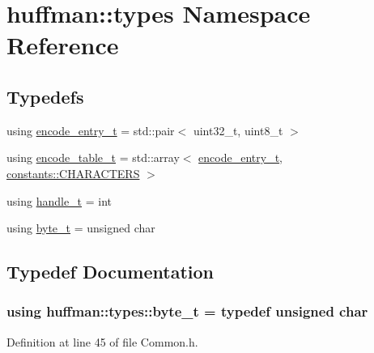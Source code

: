\hypertarget{namespacehuffman_1_1types}{}\section{huffman\+:\+:types Namespace Reference}
\label{namespacehuffman_1_1types}
\subsection*{Typedefs}
\begin{DoxyCompactItemize}
\item 
using \hyperlink{namespacehuffman_1_1types_a562530b9038f6a3cb2923f1c116a450c}{encode\+\_\+entry\+\_\+t} = std\+::pair$<$ uint32\+\_\+t, uint8\+\_\+t $>$
\item 
using \hyperlink{namespacehuffman_1_1types_a2d111e21190970dfeb935ef0786973c0}{encode\+\_\+table\+\_\+t} = std\+::array$<$ \hyperlink{namespacehuffman_1_1types_a562530b9038f6a3cb2923f1c116a450c}{encode\+\_\+entry\+\_\+t}, \hyperlink{namespacehuffman_1_1constants_a263e0c34ff9ba6afe32efbc1eeabdf88}{constants\+::\+C\+H\+A\+R\+A\+C\+T\+E\+RS} $>$
\item 
using \hyperlink{namespacehuffman_1_1types_a41dc8ca07e19043152b0a5c8b5fec90b}{handle\+\_\+t} = int
\item 
using \hyperlink{namespacehuffman_1_1types_a198fb2bbef1012ab1696124836c56f0d}{byte\+\_\+t} = unsigned char
\end{DoxyCompactItemize}


\subsection{Typedef Documentation}
\subsubsection[{\texorpdfstring{byte\+\_\+t}{byte_t}}]{\setlength{\rightskip}{0pt plus 5cm}using {\bf huffman\+::types\+::byte\+\_\+t} = typedef unsigned char}\hypertarget{namespacehuffman_1_1types_a198fb2bbef1012ab1696124836c56f0d}{}\label{namespacehuffman_1_1types_a198fb2bbef1012ab1696124836c56f0d}


Definition at line 45 of file Common.\+h.

